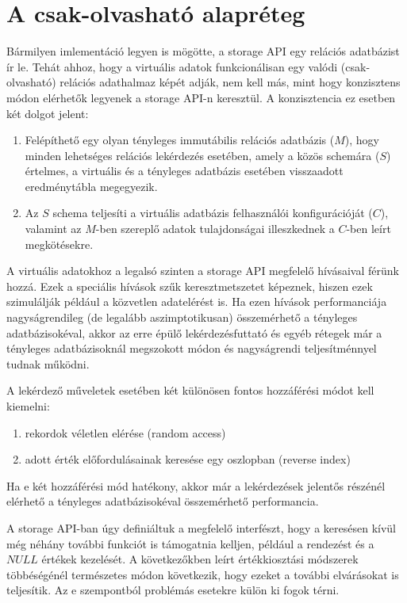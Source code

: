 \documentclass[
    parspace, %
    noindent, %
]{elteiktdk}[2023/04/10]
\begin{document}

\section{A csak-olvasható alapréteg}

Bármilyen imlementáció legyen is mögötte, a storage API egy relációs adatbázist ír le.
Tehát ahhoz, hogy a virtuális adatok funkcionálisan egy valódi (csak-olvasható) relációs adathalmaz képét adják,
nem kell más, mint hogy konzisztens módon elérhetők legyenek a storage API-n keresztül.
A konzisztencia ez esetben két dolgot jelent:

\begin{enumerate}
  \item Felépíthető egy olyan tényleges immutábilis relációs adatbázis ($M$),
        hogy minden lehetséges relációs lekérdezés esetében, amely a közös schemára ($S$) értelmes,
        a virtuális és a tényleges adatbázis esetében visszaadott eredménytábla megegyezik.
  \item Az $S$ schema teljesíti a virtuális adatbázis felhasználói konfigurációját ($C$),
        valamint az $M$-ben szereplő adatok tulajdonságai illeszkednek a $C$-ben leírt megkötésekre.
\end{enumerate}

A virtuális adatokhoz a legalsó szinten a storage API megfelelő hívásaival férünk hozzá.
Ezek a speciális hívások szűk keresztmetszetet képeznek,
hiszen ezek szimulálják például a közvetlen adatelérést is.
Ha ezen hívások performanciája nagyságrendileg (de legalább aszimptotikusan) összemérhető a tényleges adatbázisokéval,
akkor az erre épülő lekérdezésfuttató és egyéb rétegek már
a tényleges adatbázisoknál megszokott módon és nagyságrendi teljesítménnyel tudnak működni.

A lekérdező műveletek esetében két különösen fontos hozzáférési módot kell kiemelni:

\begin{enumerate}
  \item rekordok véletlen elérése (random access)
  \item adott érték előfordulásainak keresése egy oszlopban (reverse index)
\end{enumerate}

Ha e két hozzáférési mód hatékony, akkor már a lekérdezések jelentős részénél
elérhető a tényleges adatbázisokéval összemérhető performancia.

A storage API-ban úgy definiáltuk a megfelelő interfészt,
hogy a keresésen kívül még néhány további funkciót is támogatnia kelljen,
például a rendezést és a $NULL$ értékek kezelését.
A következőkben leírt értékkiosztási módszerek többéségénél természetes módon következik,
hogy ezeket a további elvárásokat is teljesítik.
Az e szempontból problémás esetekre külön ki fogok térni.
\end{document}
